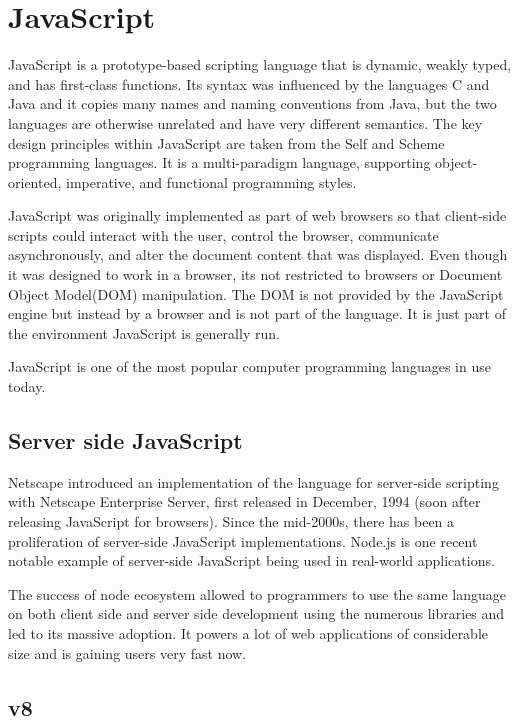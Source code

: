 \section{JavaScript}

JavaScript is a prototype-based scripting language that is dynamic, weakly
typed, and has first-class functions. Its syntax was influenced by the languages
C and Java and it copies many names and naming conventions from Java, but the
two languages are otherwise unrelated and have very different semantics. The key
design principles within JavaScript are taken from the Self and Scheme
programming languages. It is a multi-paradigm language, supporting
object-oriented, imperative, and functional programming styles.

JavaScript was originally implemented as part of web browsers so that
client-side scripts could interact with the user, control the browser,
communicate asynchronously, and alter the document content that was displayed.
Even though it was designed to work in a browser, its not restricted to browsers
or Document Object Model(DOM) manipulation. The DOM is not provided by the
JavaScript engine but instead by a browser and is not part of the language. It
is just part of the environment JavaScript is generally run.

JavaScript is one of the most popular computer programming languages in use
today.

\subsection{Server side JavaScript}

Netscape introduced an implementation of the language for server-side scripting
with Netscape Enterprise Server, first released in December, 1994 (soon after
releasing JavaScript for browsers). Since the mid-2000s, there has been a
proliferation of server-side JavaScript implementations. Node.js is one recent
notable example of server-side JavaScript being used in real-world applications.

The success of node ecosystem allowed to programmers to use the same language on
both client side and server side development using the numerous libraries and
led to its massive adoption. It powers a lot of web applications of considerable
size and is gaining users very fast now.

\subsection{v8}

